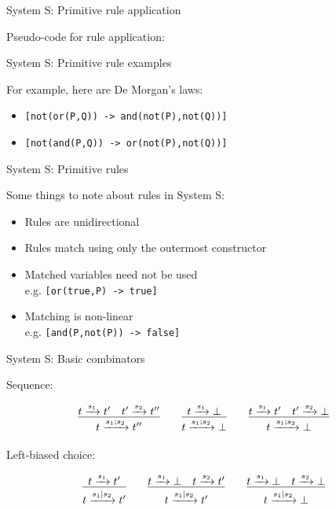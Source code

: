 \documentclass{beamer}
\newcommand{\arr}[1]{\ensuremath\xrightarrow{#1}}
\begin{document}
\begin{frame}{System S: Primitive rule application}

Pseudo-code for rule application:



\end{frame}


\begin{frame}{System S: Primitive rule examples}

For example, here are De Morgan's laws:

\begin{itemize}
  \item \texttt{[not(or(P,Q)) -> and(not(P),not(Q))]}
  \item \texttt{[not(and(P,Q)) -> or(not(P),not(Q))]}
\end{itemize}

\end{frame}

\begin{frame}{System S: Primitive rules}

Some things to note about rules in System S:

\begin{itemize}
  \item Rules are unidirectional
  \item Rules match using only the outermost constructor
  \item Matched variables need not be used\\
        e.g. \texttt{[or(true,P) -> true]}
  \item Matching is non-linear\\
        e.g. \texttt{[and(P,not(P)) -> false]}
\end{itemize}

\end{frame}


\begin{frame}{System S: Basic combinators}

Sequence:

\[
\infer{t \arr{s_1;s_2} t''}{t \arr{s_1} t' \quad t' \arr{s_2} t''}
\qquad 
\infer{t \arr{s_1;s_2} \bot}{t \arr{s_1} \bot}
\qquad
\infer{t \arr{s_1;s_2} \bot}{t \arr{s_1} t' \quad t' \arr{s_2} \bot}
\]

Left-biased choice:

\[
\infer{t \arr{s_1|s_2} t'}{t \arr{s_1} t'}
\qquad 
\infer{t \arr{s_1|s_2} t'}{t \arr{s_1} \bot \quad t \arr{s_2} t'}
\qquad
\infer{t \arr{s_1|s_2} \bot}{t \arr{s_1} \bot \quad t \arr{s_2} \bot}
\]

\end{frame}
\end{document}
